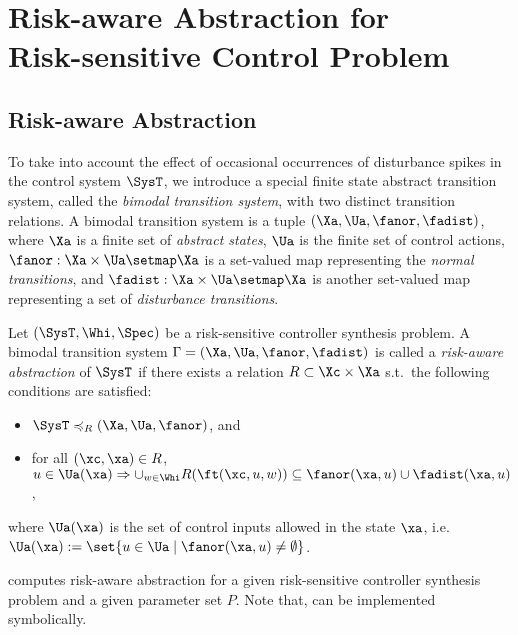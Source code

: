 \section{Risk-aware Abstraction for\\ Risk-sensitive Control Problem}\label{sec:compute_abs}



\subsection{Risk-aware Abstraction}

To take into account the effect of occasional occurrences of disturbance spikes in the control system $\SysT$, we introduce a special finite state abstract transition system, called the \emph{bimodal transition system}, with two distinct transition relations.
A bimodal transition system is a tuple $(\Xa,\Ua,\fanor,\fadist)$, where $\Xa$ is a finite set of \emph{abstract states}, $\Ua$ is the finite set of control actions, $\fanor:\Xa\times \Ua\setmap \Xa$ is a set-valued map representing the \emph{normal transitions}, and $\fadist:\Xa\times \Ua\setmap \Xa$ is another set-valued map representing a set of \emph{disturbance transitions}.

\begin{definition}\label{def:risk-aware abstraction}
	Let $(\SysT,\Whi,\Spec)$ be a risk-sensitive controller synthesis problem.
	A bimodal transition system $\Gamma=(\Xa,\Ua,\fanor,\fadist)$ is called a \emph{risk-aware abstraction} of $\SysT$ if there exists a relation $R\subset \Xc\times \Xa$ s.t.\ the following conditions are satisfied:
	\begin{itemize}
		\item $\SysT \preccurlyeq_R (\Xa,\Ua,\fanor)$, and
		\item for all $(\xc,\xa)\in R$, $u\in \Ua(\xa)\Rightarrow \cup_{w\in \Whi}R(\ft(\xc,u,w))\subseteq \fanor(\xa,u)\cup \fadist(\xa,u)$,
	\end{itemize}
	where $\Ua(\xa)$ is the set of control inputs allowed in the state $\xa$, i.e.\ $\Ua(\xa):=\set{u\in\Ua\mid \fanor(\xa,u)\neq \emptyset}$.
\end{definition}

 computes risk-aware abstraction for a given risk-sensitive controller synthesis problem and a given parameter set $P$.
Note that,  can be implemented symbolically.

